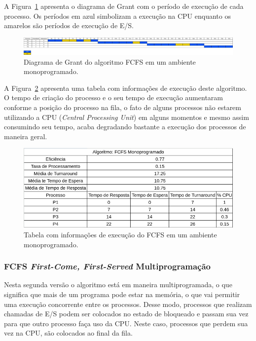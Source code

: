 \documentclass[
	12pt,				%
	oneside,   	        %
	a4paper,			%
	english,			%
	french,				%
	spanish,			%
	brazil,				%
	]{pacotes/abntex2}
\begin{document}
A Figura~\ref{fig:fcfs-mono} apresenta o diagrama de Grant com o período de execução de cada processo. Os períodos em azul simbolizam a execução na CPU enquanto os amarelos são períodos de execução de E/S.

\begin{figure}[H]
  \centering
  \includegraphics[scale=0.20]{figuras/ex1/fifo-mono.png}
  \caption{Diagrama de Grant do algoritmo FCFS em um ambiente monoprogramado.}
  \label{fig:fcfs-mono}
\end{figure}

A Figura~\ref{fig:table-fcfs-mono} apresenta uma tabela com informações de execução deste algoritmo. O tempo de criação do processo e o seu tempo de execução aumentaram conforme a posição do processo na fila, o fato de alguns processos não estarem utilizando a CPU (\textit{Central Processing Unit}) em  alguns momentos e mesmo assim consumindo seu tempo, acaba degradando bastante a execução dos processos de maneira geral.

\begin{figure}[H]
  \centering
  \includegraphics[scale=0.5]{figuras/ex1/table-fifo-mono.png}
  \caption{Tabela com informações de execução do FCFS em um ambiente monoprogramado.}
  \label{fig:table-fcfs-mono}
\end{figure}

\subsubsection{FCFS \textit{First-Come, First-Served} Multiprogramação}
\label{subsubsec:multi_fcfs}

Nesta segunda versão o algoritmo está em maneira multiprogramada, o que significa que mais de um programa pode estar na memória, o que vai permitir uma execução concorrente entre os processos. Desse modo, processos que realizam chamadas de E/S podem ser colocados no estado de bloqueado e passam sua vez para que outro processo faça uso da CPU. Neste caso, processos que perdem sua vez na CPU, são colocados ao final da fila. 
\end{document}

